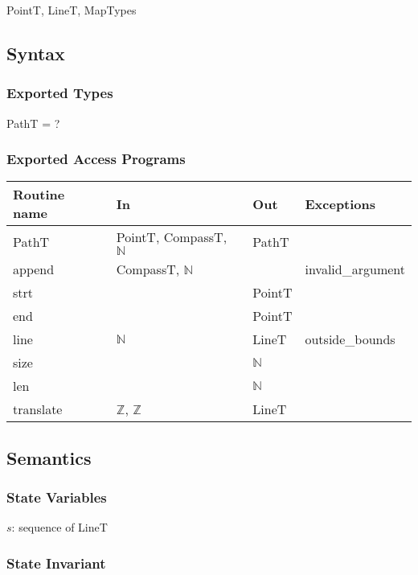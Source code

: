 \documentclass[12pt]{article}
\begin{document}
PointT, LineT, MapTypes

\subsection* {Syntax}

\subsubsection* {Exported Types}

PathT = ?

\subsubsection* {Exported Access Programs}

\begin{tabular}{| l | l | l | l |}
\hline
\textbf{Routine name} & \textbf{In} & \textbf{Out} & \textbf{Exceptions}\\
\hline
PathT & PointT, CompassT, $\mathbb{N}$ & PathT & \\ %
\hline
append & CompassT, $\mathbb{N}$ & & invalid\_argument\\ 
\hline
strt & ~ & PointT & ~\\
\hline
end & ~ & PointT & ~\\
\hline
line & $\mathbb{N}$ & LineT & outside\_bounds\\
\hline
size & ~ & $\mathbb{N}$ & \\
\hline
 len & ~ & $\mathbb{N}$ & ~\\
\hline
translate & $\mathbb{Z}$, $\mathbb{Z}$ & LineT  & ~\\
\hline
\end{tabular}

\subsection* {Semantics}

\subsubsection* {State Variables}

$s$: sequence of LineT

\subsubsection* {State Invariant}
\end{document}
